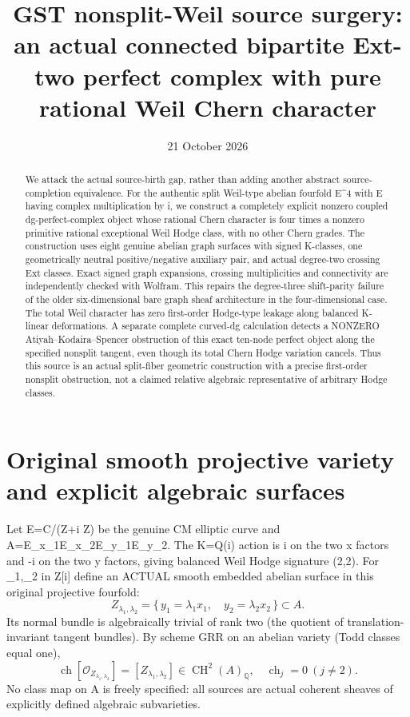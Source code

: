 \documentclass[11pt,a4paper]{article}
\title{GST nonsplit-Weil source surgery: an actual connected bipartite
Ext-two perfect complex with pure rational Weil Chern character}
\date{21 October 2026}
\newcommand{\Q}{\mathbb Q}
\newcommand{\CH}{\operatorname{CH}}
\newcommand{\ch}{\operatorname{ch}}
\begin{document}
\maketitle
\begin{abstract}
We attack the actual source-birth gap, rather than adding another
abstract source-completion equivalence. For the authentic split
Weil-type abelian fourfold E^4 with E having complex multiplication
by i, we construct a completely explicit nonzero coupled
dg-perfect-complex object whose rational Chern character is
four times a nonzero primitive rational exceptional Weil Hodge class,
with no other Chern grades. The construction uses eight genuine
abelian graph surfaces with signed K-classes, one geometrically
neutral positive/negative auxiliary pair, and actual degree-two
crossing Ext classes. Exact signed graph expansions, crossing
multiplicities and connectivity are independently checked with
Wolfram. This repairs the degree-three shift-parity failure of the
older six-dimensional bare graph sheaf architecture in the
four-dimensional case. The total Weil character has zero first-order
Hodge-type leakage along balanced K-linear deformations.
A separate complete curved-dg calculation detects a NONZERO
Atiyah--Kodaira--Spencer obstruction of this exact ten-node
perfect object along the specified nonsplit tangent, even though
its total Chern Hodge variation cancels. Thus this source is
an actual split-fiber geometric construction with a precise
first-order nonsplit obstruction, not a claimed relative
algebraic representative of arbitrary Hodge classes.
\end{abstract}
\section{Original smooth projective variety and explicit algebraic surfaces}
Let E=C/(Z+i Z) be the genuine CM elliptic curve and
A=E_{x_1}\times E_{x_2}\times E_{y_1}\times E_{y_2}.
The K=Q(i) action is i on the two x factors and -i on
the two y factors, giving balanced Weil Hodge signature (2,2).
For \lambda_1,\lambda_2 in Z[i] define an ACTUAL smooth
embedded abelian surface in this original projective fourfold:
\[
 Z_{\lambda_1,\lambda_2}
 =\{\,y_1=\lambda_1 x_1,\quad y_2=\lambda_2 x_2\,\}
             \subset A.                            \tag{1.1}
\]
Its normal bundle is algebraically trivial of rank two
(the quotient of translation-invariant tangent bundles).
By scheme GRR on an abelian variety (Todd classes equal one),
\[
 \boxed{\ch[\mathcal O_{Z_{\lambda_1,\lambda_2}}]
          =[Z_{\lambda_1,\lambda_2}]
          \in\CH^2(A)_\Q,\quad
          \ch_j=0\ (j\ne2).}                        \tag{1.2}
\]
No class map on A is freely specified: all sources are actual
coherent sheaves of explicitly defined algebraic subvarieties.
\end{document}
